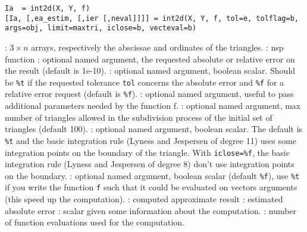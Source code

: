 
\begin{mandesc}
\end{mandesc}

\begin{calling_sequence}
\begin{verbatim}
Ia  = int2d(X, Y, f)
[Ia, [,ea_estim, [,ier [,neval]]]] = int2d(X, Y, f, tol=e, tolflag=b, args=obj, limit=maxtri, iclose=b, vecteval=b)
\end{verbatim}
\end{calling_sequence}
\begin{parameters}
  \begin{varlist}
    :  $3 \times n$ arrays, respectively the abscissae and
    ordinates of the triangles.
    : nsp function
    : optional named argument, the requested absolute or
    relative error on the result (default is 1e-10).
    : optional named argument, boolean scalar. Should be
    \verb+%t+ if the requested tolerance \verb+tol+ concerns the absolute
     error and \verb+%f+ for a relative error request (default is \verb+%f+).
    : optional named argument, useful to pass
    additional parameters needed by the function f.
    : optional named argument, max number of
    triangles allowed in the subdivision process of the initial set of
    triangles (default 100).
    : optional named argument, boolean scalar. The
    default is \verb+%t+ and the basic integration rule (Lyness and 
    Jespersen of degree 11) uses some integration points on the
    boundary of the triangle. With \verb+iclose=%f+, the basic
    integration rule (Lyness and Jespersen of degree 8) don't
    use integration points on the boundary.
    : optional named argument, boolean scalar
    (default \verb+%f+), use \verb+%t+ if you write the function
    \verb+f+ such that it could be evaluated on vectors arguments 
    (this speed up the computation).
    : computed approximate result
    : estimated absolute error
    : scalar given some information about the computation.
    : number of function evaluations used for the computation.
  \end{varlist}
\end{parameters}

